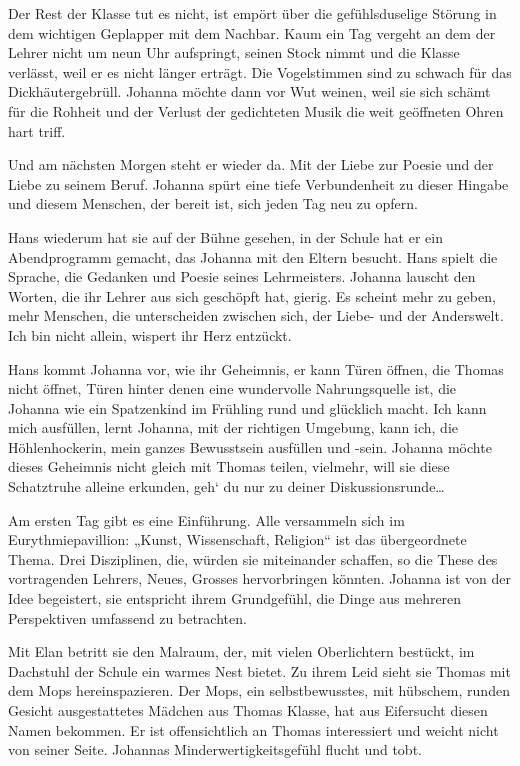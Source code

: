 \documentclass[10pt,titlepage,a5paper]{book}
\begin{document}
 Der Rest der Klasse tut es nicht, ist empört über die gefühlsduselige Störung in dem wichtigen Geplapper mit dem Nachbar. Kaum ein Tag  vergeht an dem der Lehrer nicht um neun Uhr aufspringt, seinen Stock nimmt und die Klasse verlässt, weil er es nicht länger erträgt. Die Vogelstimmen sind zu schwach für das Dickhäutergebrüll. Johanna möchte dann vor Wut weinen, weil sie sich schämt für die Rohheit und der Verlust der gedichteten Musik die weit geöffneten Ohren hart triff.

Und am nächsten Morgen steht er wieder da. Mit der Liebe zur Poesie und der Liebe zu seinem Beruf. Johanna spürt eine tiefe Verbundenheit zu dieser Hingabe und diesem Menschen, der bereit ist, sich jeden Tag neu zu opfern.

Hans wiederum hat sie auf der Bühne gesehen, in der Schule hat er ein Abendprogramm gemacht, das Johanna mit den Eltern besucht. Hans spielt die Sprache, die Gedanken und Poesie seines Lehrmeisters. Johanna lauscht den Worten, die ihr Lehrer aus sich geschöpft hat, gierig. Es scheint mehr zu geben, mehr Menschen, die unterscheiden zwischen sich, der Liebe- und der Anderswelt. Ich bin nicht allein, wispert ihr Herz entzückt.

Hans kommt Johanna vor, wie ihr Geheimnis, er kann Türen öffnen, die Thomas nicht öffnet, Türen hinter denen eine wundervolle Nahrungsquelle ist, die Johanna wie ein Spatzenkind im Frühling rund und glücklich macht. Ich kann mich ausfüllen, lernt Johanna, mit der richtigen Umgebung, kann ich, die Höhlenhockerin, mein ganzes Bewusstsein ausfüllen und -sein. Johanna möchte dieses Geheimnis nicht gleich mit Thomas teilen, vielmehr, will sie diese Schatztruhe alleine erkunden, geh` du nur zu deiner Diskussionsrunde\dots 

Am ersten Tag gibt es eine Einführung. Alle versammeln sich im Eurythmiepavillion: „Kunst, Wissenschaft, Religion“ ist das über\-geordnete Thema. Drei Disziplinen, die, würden sie miteinander schaffen, so die These des vortragenden Lehrers, Neues, Grosses hervorbringen könnten. Johanna ist von der Idee begeistert, sie entspricht ihrem Grundgefühl,  die Dinge aus mehreren Perspektiven umfassend zu betrachten.

Mit Elan betritt sie den Malraum, der, mit vielen Oberlichtern be\-stückt, im Dachstuhl der Schule ein warmes Nest bietet. Zu ihrem Leid sieht sie Thomas mit dem Mops hereinspazieren. Der Mops, ein selbstbewusstes, mit hübschem, runden Gesicht ausgestattetes Mädchen aus Thomas Klasse, hat aus Eifersucht diesen Namen bekommen. Er ist offensichtlich an Thomas interessiert und weicht nicht von seiner Seite. Johannas Minderwertigkeitsgefühl flucht und tobt.
\end{document}
